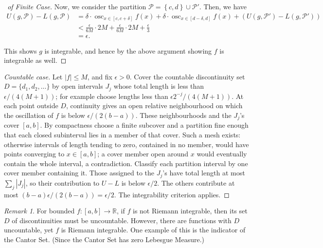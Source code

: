 \documentclass[11pt]{article}
\numberwithin{equation}{section}
\theoremstyle{definition}
\theoremstyle{remark}
\newtheorem{remark}[theorem]{Remark}
\newcommand{\pqty}[1]{\left(#1\right)}
\newcommand{\Bqty}[1]{\left\{#1\right\}}
\newcommand{\ccintv}[2]{[#1,#2]}
\DeclareMathOperator{\osc}{osc}
\newcommand{\partition}{\mathcal P}
\newcommand{\upperSum}{U}
\newcommand{\lowerSum}{L}
\begin{document}
\begin{proof}[\proofname\ of Finite Case]
    Now, we consider the partition \(\partition = \Bqty{c, d} \cup \partition'\). Then, we have
    \begin{align*}
        \upperSum\pqty{g, \partition} - \lowerSum\pqty{g, \partition} &= \delta \cdot \osc_{x \in \ccintv{c}{c + \delta}} f\pqty{x} + \delta \cdot \osc_{x \in \ccintv{d - \delta}{d}} f\pqty{x} + \pqty{\upperSum\pqty{g, \partition'} - \lowerSum\pqty{g, \partition'}} \\
        &< \frac{\epsilon}{6M} \cdot 2M + \frac{\epsilon}{6M} \cdot 2M + \frac{\epsilon}{3} \\
        &= \epsilon.
    \end{align*}

    This shows \(g\) is integrable, and hence by the above argument showing \(f\) is integrable as well.
\end{proof}

\begin{proof}[Countable case]
Let \(|f|\le M\), and fix \(\epsilon>0\). Cover the countable discontinuity set
\(D=\{d_1,d_2,\ldots\}\) by open intervals \(J_j\) whose total length is less
than \(\epsilon/(4(M+1))\); for example choose lengths less than
\(\epsilon 2^{-j}/(4(M+1))\). At each point outside \(D\), continuity gives
an open relative neighbourhood on which the oscillation of \(f\) is below
\(\epsilon/(2(b-a))\). These neighbourhoods and the \(J_j\)'s cover \([a,b]\).
By compactness choose a finite subcover and a partition fine enough that each
closed subinterval lies in a member of that cover.
Such a mesh exists: otherwise intervals of length tending to zero, contained
in no member, would have points converging to \(x\in[a,b]\); a cover member
open around \(x\) would eventually contain the whole interval, a contradiction.
Classify each partition interval by one cover member containing it.
Those assigned to the \(J_j\)'s have total length at most \(\sum_j|J_j|\),
so their contribution to \(U-L\) is below \(\epsilon/2\). The others contribute
at most \((b-a)\epsilon/(2(b-a))=\epsilon/2\). The integrability criterion applies.
\end{proof}

\begin{remark}\label{analysis-unit-0158}
    For bounded \(f:[a,b]\to\mathbb R\), if \(f\) is not Riemann integrable, then its set \(D\) of discontinuities must be uncountable. However, there are functions with \(D\) uncountable, yet \(f\) is Riemann integrable. One example of this is the indicator of the Cantor Set. (Since the Cantor Set has zero Lebesgue Measure.)
\end{remark}
\end{document}
